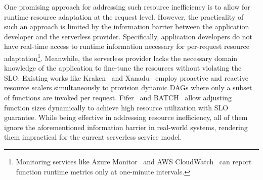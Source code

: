 One promising approach for addressing such resource inefficiency is to allow for runtime resource adaptation at the request level. However, the practicality of such an approach is limited by the information barrier between the application developer and the serverless provider. Specifically, application developers do not have real-time access to runtime information necessary for per-request resource adaptation\footnote{Monitoring services like Azure Monitor~\cite{azure-monitor} and AWS CloudWatch~\cite{aws-cloudwatch} can report function runtime metrics only at one-minute intervals.}. Meanwhile, the serverless provider lacks the necessary domain knowledge of the application to fine-tune the resources without violating the SLO. 
Existing works like Kraken~\cite{socc21-kraken} and Xanadu~\cite{middleware20-xanadu} employ proactive and reactive resource scalers simultaneously to provision dynamic DAGs where only a subset of functions are invoked per request. Fifer~\cite{middleware20-fifer} and BATCH~\cite{sc20-batch} allow adjusting function sizes dynamically to achieve high resource utilization with SLO guarantee. While being effective in addressing resource inefficiency, all of them ignore the aforementioned information barrier in real-world systems, rendering them impractical for the current serverless service model.



